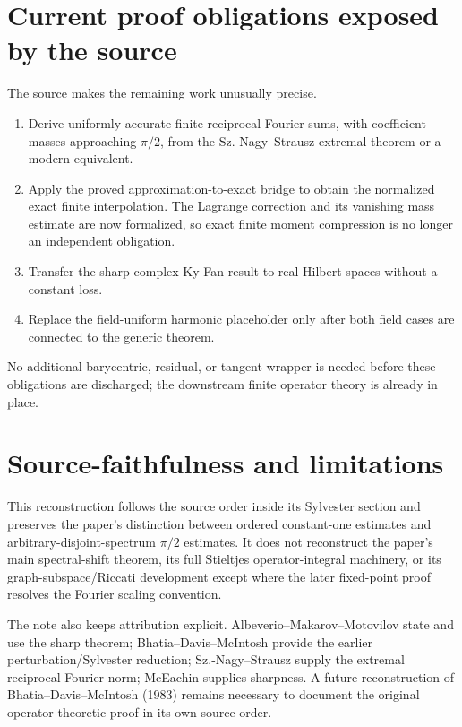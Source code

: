 \section{Current proof obligations exposed by the source}

The source makes the remaining work unusually precise.

\begin{enumerate}[leftmargin=2em]
\item Derive uniformly accurate finite reciprocal Fourier sums, with coefficient masses approaching $\pi/2$, from the Sz.-Nagy--Strausz extremal theorem or a modern equivalent.
\item Apply the proved approximation-to-exact bridge to obtain the normalized exact finite interpolation. The Lagrange correction and its vanishing mass estimate are now formalized, so exact finite moment compression is no longer an independent obligation.
\item Transfer the sharp complex Ky Fan result to real Hilbert spaces without a constant loss.
\item Replace the field-uniform harmonic placeholder only after both field cases are connected to the generic theorem.
\end{enumerate}

No additional barycentric, residual, or tangent wrapper is needed before these obligations are discharged; the downstream finite operator theory is already in place.

\section*{Source-faithfulness and limitations}

This reconstruction follows the source order inside its Sylvester section and preserves the paper's distinction between ordered constant-one estimates and arbitrary-disjoint-spectrum $\pi/2$ estimates. It does not reconstruct the paper's main spectral-shift theorem, its full Stieltjes operator-integral machinery, or its graph-subspace/Riccati development except where the later fixed-point proof resolves the Fourier scaling convention.

The note also keeps attribution explicit. Albeverio--Makarov--Motovilov state and use the sharp theorem; Bhatia--Davis--McIntosh provide the earlier perturbation/Sylvester reduction; Sz.-Nagy--Strausz supply the extremal reciprocal-Fourier norm; McEachin supplies sharpness. A future reconstruction of Bhatia--Davis--McIntosh (1983) remains necessary to document the original operator-theoretic proof in its own source order.


